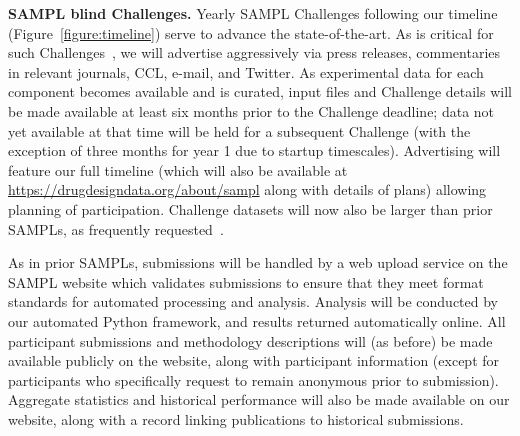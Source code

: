 \documentclass[11pt]{article}
\begin{document}
\textbf{SAMPL blind Challenges.} Yearly SAMPL Challenges following our timeline (Figure~\ref{figure:timeline}) serve to advance the state-of-the-art.
As is critical for such Challenges~\cite{Saez-Rodriguez:2016:NatRevGenet}, we will advertise aggressively via press releases, commentaries in relevant journals, CCL, e-mail, and Twitter. 
As experimental data for each component becomes available and is curated, input files and Challenge details will be made available at least six months prior to the Challenge deadline; data not yet available at that time will be held for a subsequent Challenge (with the exception of three months for year 1 due to startup timescales).
Advertising will feature our full timeline (which will also be available at \url{https://drugdesigndata.org/about/sampl} along with details of plans) allowing planning of participation. 
Challenge datasets will now also be larger than prior SAMPLs, as frequently requested~\cite{Mobley:2017:eScholarship}. 


As in prior SAMPLs, submissions will be handled by a web upload service on the SAMPL website which validates submissions to ensure that they meet format standards for automated processing and analysis. 
Analysis will be conducted by our automated Python framework, and results returned automatically online.
All participant submissions and methodology descriptions will (as before) be made available publicly on the website, along with participant information (except for participants who specifically request to remain anonymous prior to submission).
Aggregate statistics and historical performance will also be made available on our website, along with a record linking publications to historical submissions.
\end{document}
